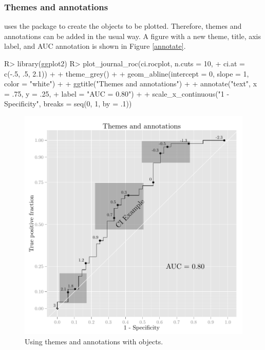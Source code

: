\documentclass[codesnippet]{jss}
\begin{document}
\subsubsection{Themes and annotations}\label{themes-and-annotations}

 uses the  package to create the objects to be
plotted. Therefore, themes and annotations can be added in the usual
 way. A  figure with a new theme,
title, axis label, and AUC annotation is shown in Figure \ref{annotate}.

\begin{Schunk}
\begin{Sinput}
R> library(ggplot2)
R> plot_journal_roc(ci.rocplot, n.cuts = 10, 
+                  ci.at = c(-.5, .5, 2.1)) + 
+   theme_grey() + 
+   geom_abline(intercept = 0, slope = 1, color = "white") + 
+   ggtitle("Themes and annotations") + 
+   annotate("text", x = .75, y = .25, 
+            label = "AUC = 0.80") +
+   scale_x_continuous("1 - Specificity", breaks = seq(0, 1, by = .1))
\end{Sinput}
\begin{figure}
\includegraphics{figure/print2-1} \caption{Using  themes and annotations with  objects. \label{annotate}}\label{fig:print2}
\end{figure}
\end{Schunk}
\end{document}
